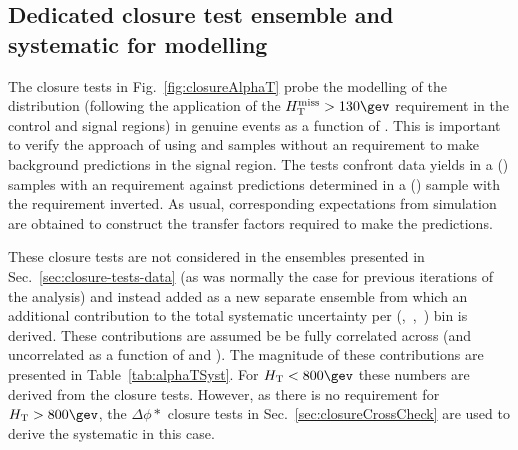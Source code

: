 \subsection{Dedicated closure test ensemble and systematic for \alphat modelling}
\label{sec:alphat_closure} 

The closure tests in Fig.~\ref{fig:closureAlphaT} probe the modelling
of the \alphat distribution (following the application of the $\mht >
130\gev$ requirement in the control and signal regions) in genuine
\met events as a function of \scalht. This is important to verify the
approach of using \mj and \mmj samples without an \alphat requirement
to make background predictions in the signal region. The tests
confront data yields in a \mj (\mmj) samples with an \alphat
requirement against predictions determined in a \mj (\mmj) sample with
the \alphat requirement inverted. As usual, corresponding expectations
from simulation are obtained to construct the transfer factors
required to make the predictions.

These closure tests are not considered in the ensembles presented in
Sec.~\ref{sec:closure-tests-data} (as was normally the case for
previous iterations of the analysis) and instead added as a new
separate ensemble from which an additional contribution to the total
systematic uncertainty per (\njet,~\nb,~\scalht) bin is derived. These
contributions are assumed be be fully correlated across \nb (and
uncorrelated as a function of \njet and \scalht). The magnitude of
these contributions are presented in Table~\ref{tab:alphaTSyst}. For
$\scalht<800\gev$ these numbers are derived from the \alphat closure
tests. However, as there is no \alphat requirement for
$\scalht>800\gev$, the $\Delta\phi *$ closure tests in
Sec.~\ref{sec:closureCrossCheck} are used to derive the systematic in
this case.

